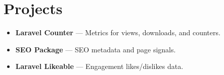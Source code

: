 \section*{Projects}
\begin{itemize}
  \item \textbf{Laravel Counter} --- Metrics for views, downloads, and counters.
  \item \textbf{SEO Package} --- SEO metadata and page signals.
  \item \textbf{Laravel Likeable} --- Engagement likes/dislikes data.
\end{itemize}
